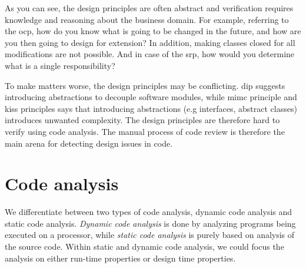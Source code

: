 \documentclass[pdftex,10pt,b5paper,twoside]{report}
\begin{document}
As you can see, the design principles are often abstract and verification requires knowledge and reasoning about the business domain. For example, referring to the \gls{ocp}, how do you know what is going to be changed in the future, and how are you then going to design for extension? In addition, making classes closed for all modifications are not possible. And in case of the \gls{srp}, how would you determine what is a single responsibility? 

To make matters worse, the design principles may be conflicting. \gls{dip} suggests introducing abstractions to decouple software modules, while \gls{mimc} principle and \gls{kiss} principles says that introducing abstractions (e.g interfaces, abstract classes) introduces unwanted complexity. The design principles are therefore hard to verify using code analysis. The manual process of code review is therefore the main arena for detecting design issues in code.

\section{Code analysis}
\label{code-analysis}
We differentiate between two types of code analysis, dynamic code analysis and static code analysis. \textit{Dynamic code analysis} is done by analyzing programs being executed on a processor, while \textit{static code analysis} is purely based on analysis of the source code. Within static and dynamic code analysis, we could focus the analysis on either run-time properties or design time properties.
\end{document}
